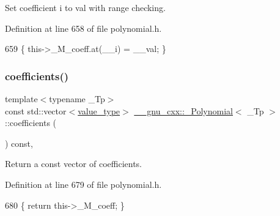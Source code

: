 Set coefficient {\ttfamily i} to {\ttfamily val} with range checking. 

Definition at line 658 of file polynomial.\+h.


\begin{DoxyCode}
659       \{ this->\_M\_coeff.at(\_\_i) = \_\_val; \}
\end{DoxyCode}
\mbox{\label{class____gnu__cxx_1_1__Polynomial_ab820a7c08a907ebfb5b8765fcf861ead}} 
\subsubsection{\texorpdfstring{coefficients()}{coefficients()}\hspace{0.1cm}{\footnotesize\ttfamily [1/2]}}
{\footnotesize\ttfamily template$<$typename \+\_\+\+Tp$>$ \\
const std\+::vector$<$\hyperlink{class____gnu__cxx_1_1__Polynomial_a725563351f50e76084a7a016c06f8a53}{value\+\_\+type}$>$ \hyperlink{class____gnu__cxx_1_1__Polynomial}{\+\_\+\+\_\+gnu\+\_\+cxx\+::\+\_\+\+Polynomial}$<$ \+\_\+\+Tp $>$\+::coefficients (\begin{DoxyParamCaption}{ }\end{DoxyParamCaption}) const\hspace{0.3cm}{\ttfamily [inline]}, {\ttfamily [noexcept]}}

Return a const vector of coefficients. 

Definition at line 679 of file polynomial.\+h.


\begin{DoxyCode}
680       \{ \textcolor{keywordflow}{return} this->\_M\_coeff; \}
\end{DoxyCode}
\mbox{\label{class____gnu__cxx_1_1__Polynomial_a997df1a87fc9ef82d35ccef585321b4c}} 
